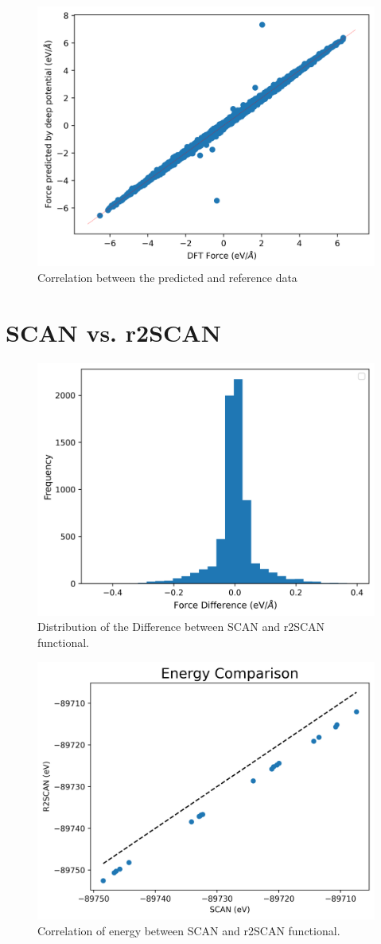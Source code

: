 \begin{figure}[h!]
  \centering
   \includegraphics[width=0.5\linewidth]{images/force_correlation.png}
  \caption{Correlation between the predicted and reference data}
\end{figure}

\clearpage

\section{SCAN vs. r2SCAN}
\begin{figure}[h!]
  \centering
   \includegraphics[width=0.5\linewidth]{images/scan_vs_r2scan/r2scan_hist_force.png}
  \caption{Distribution of the Difference between SCAN and r2SCAN functional. }
\end{figure}

\begin{figure}[h!]
  \centering
   \includegraphics[width=0.5\linewidth]{images/scan_vs_r2scan/energy_compare.png}
  \caption{ Correlation of energy between SCAN and r2SCAN functional. }
\end{figure}

